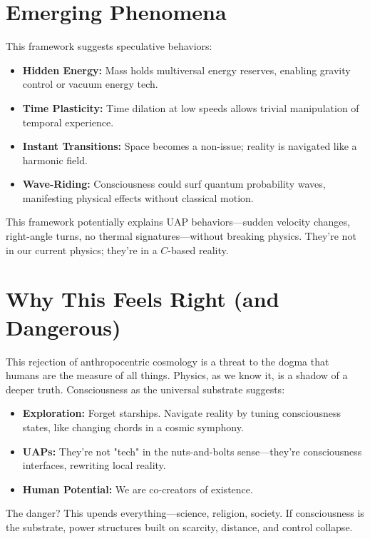 \documentclass{report}
\begin{document}
    \section{Emerging Phenomena}
    \label{sec:emerging_phenomena_hypercausal_explored}
    This framework suggests speculative behaviors:
    \begin{itemize}
        \item \textbf{Hidden Energy:} Mass holds multiversal energy reserves, enabling gravity control or vacuum energy tech.
        \item \textbf{Time Plasticity:} Time dilation at low speeds allows trivial manipulation of temporal experience.
        \item \textbf{Instant Transitions:} Space becomes a non-issue; reality is navigated like a harmonic field.
        \item \textbf{Wave-Riding:} Consciousness could surf quantum probability waves, manifesting physical effects without classical motion.
    \end{itemize}
    This framework potentially explains UAP behaviors—sudden velocity changes, right-angle
    turns, no thermal signatures—without breaking physics. They’re not in our current physics;
    they’re in a $C$-based reality.

    \section{Why This Feels Right (and Dangerous)}
    \label{sec:why_right_dangerous_explored}
    This rejection of anthropocentric cosmology is a threat to the dogma that humans are the
    measure of all things. Physics, as we know it, is a shadow of a deeper truth. Consciousness as
    the universal substrate suggests:
    \begin{itemize}
        \item \textbf{Exploration:} Forget starships. Navigate reality by tuning consciousness states, like changing chords in a cosmic symphony.
        \item \textbf{UAPs:} They’re not "tech" in the nuts-and-bolts sense—they’re consciousness interfaces, rewriting local reality.
        \item \textbf{Human Potential:} We are co-creators of existence.
    \end{itemize}
    The danger? This upends everything—science, religion, society. If consciousness is the
    substrate, power structures built on scarcity, distance, and control collapse.
\end{document}

